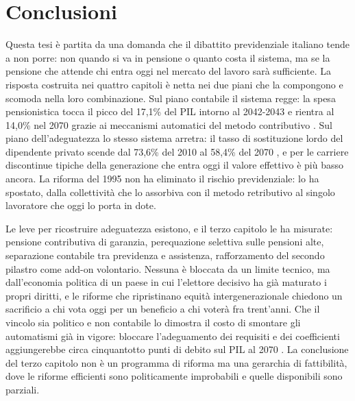 
\chapter*{Conclusioni}

\noindent
Questa tesi è partita da una domanda che il dibattito previdenziale italiano
tende a non porre: non quando si va in pensione o quanto costa il sistema, ma
se la pensione che attende chi entra oggi nel mercato del lavoro sarà
sufficiente. La risposta costruita nei quattro capitoli è netta nei due piani
che la compongono e scomoda nella loro combinazione. Sul piano contabile il
sistema regge: la spesa pensionistica tocca il picco del 17,1\% del PIL intorno
al 2042-2043 e rientra al 14,0\% nel 2070 grazie ai meccanismi automatici del
metodo contributivo \cite{MEF_RGS2025_NdA}. Sul piano dell'adeguatezza lo stesso
sistema arretra: il tasso di sostituzione lordo del dipendente privato scende dal
73,6\% del 2010 al 58,4\% del 2070 \cite{MEF_RGS2025}, e per le carriere
discontinue tipiche della generazione che entra oggi il valore effettivo è più
basso ancora. La riforma del 1995 non ha eliminato il rischio previdenziale: lo
ha spostato, dalla collettività che lo assorbiva con il metodo retributivo al
singolo lavoratore che oggi lo porta in dote.

Le leve per ricostruire adeguatezza esistono, e il terzo capitolo le ha misurate:
pensione contributiva di garanzia, perequazione selettiva sulle pensioni alte,
separazione contabile tra previdenza e assistenza, rafforzamento del secondo
pilastro come add-on volontario. Nessuna è bloccata da un limite tecnico, ma
dall'economia politica di un paese in cui l'elettore decisivo ha già maturato i
propri diritti, e le riforme che ripristinano equità intergenerazionale chiedono un
sacrificio a chi vota oggi per un beneficio a chi voterà fra trent'anni. Che il
vincolo sia politico e non contabile lo dimostra il costo di smontare gli
automatismi già in vigore: bloccare l'adeguamento dei requisiti e dei coefficienti
aggiungerebbe circa cinquantotto punti di debito sul PIL al 2070
\cite{MEF_RGS2025_NdA}. La conclusione del terzo capitolo non è un programma di
riforma ma una gerarchia di fattibilità, dove le riforme efficienti sono
politicamente improbabili e quelle disponibili sono parziali.

